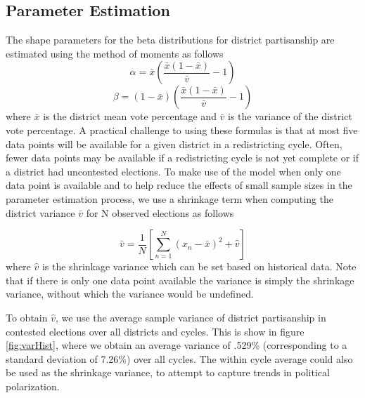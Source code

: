 \documentclass[preprint,12pt]{article}
\begin{document}
\subsection{Parameter Estimation}
The shape parameters for the beta distributions for district partisanship are estimated using the method of moments as follows
\begin{equation}
    \alpha = \bar{x} \left(\frac{\bar{x}\left(1-\bar{x}\right)}{\bar{v}}-1\right)
\end{equation}
\begin{equation}
    \beta = \left(1-\bar{x}\right) \left(\frac{\bar{x}\left(1-\bar{x}\right)}{\bar{v}}-1\right)
\end{equation}
where $\bar{x}$ is the district mean vote percentage and $\bar{v}$ is the variance of the district vote percentage.
A practical challenge to using these formulas is that at most five data points will be available for a given district in a redistricting cycle.
Often, fewer data points may be available if a redistricting cycle is not yet complete or if a district had uncontested elections.
To make use of the model when only one data point is available and to help reduce the effects of small sample sizes in the parameter estimation process, we use a shrinkage term when computing the district variance $\bar{v}$ for N observed elections as follows

\begin{equation}
    \bar{v} = \frac{1}{N}\left[\sum_{n=1}^{N}\left(x_{n}-\bar{x}\right)^{2}+\hat{v}\right]
\end{equation}
where $\hat{v}$ is the shrinkage variance which can be set based on historical data.
Note that if there is only one data point available the variance is simply the shrinkage variance, without which the variance would be undefined.

To obtain $\hat{v}$, we use the average sample variance of district partisanship in contested elections over all districts and cycles.
This is show in figure \ref{fig:varHist}, where we obtain an average variance of .529\% (corresponding to a standard deviation of 7.26\%) over all cycles.
The within cycle average could also be used as the shrinkage variance, to attempt to capture trends in political polarization.
\end{document}
